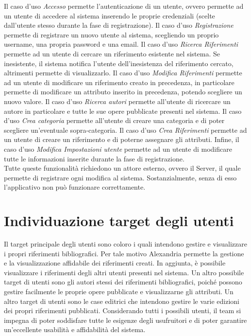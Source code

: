 Il caso d'uso \textit{Accesso} permette l'autenticazione di un utente, ovvero permette ad un utente di accedere al sistema inserendo le proprie credenziali (scelte dall'utente stesso durante la fase di registrazione). Il caso d'uso \textit{Registrazione} permette di registrare un nuovo utente al sistema, scegliendo un proprio username, una propria password e una email. Il caso d'uso \textit{Ricerca Riferimenti} permette ad un utente di cercare un riferimento esistente nel sistema. Se inesistente, il sistema notifica l'utente dell'inesistenza del riferimento cercato, altrimenti permette di visualizzarlo. Il caso d'uso \textit{Modifica Riferimenti} permette ad un utente di modificare un riferimento creato in precedenza, in particolare permette di modificare un \gls{attributo} inserito in precedenza,  potendo scegliere un nuovo valore. Il caso d'uso \textit{Ricerca autori} permette all'utente di ricercare un autore in particolare e tutte le sue opere pubblicate presenti nel sistema. Il caso d'uso \textit{Crea categoria} permette all'utente di creare una categoria e di poter scegliere un'eventuale \gls{sopra-categoria}. Il caso d'uso \textit{Crea Riferimenti} permette ad un utente di creare un riferimento e di poterne assegnare gli attributi. Infine, il caso d'uso \textit{Modifica Impostazioni utente} permette ad un utente di modificare tutte le informazioni inserite durante la fase di registrazione.\\
Tutte queste funzionalità richiedono un attore esterno, ovvero il Server, il quale permette di registrare ogni modifica al sistema. Sostanzialmente, senza di esso l'applicativo non può funzionare correttamente.


\raggedright{\section{Individuazione target degli utenti}}
Il target principale degli utenti sono coloro i quali intendono gestire e visualizzare i propri riferimenti bibliografici. Per tale motivo Alexandria permette la gestione e la visualizzazione affidabile dei riferimenti creati. In aggiunta, è possibile visualizzare i riferimenti degli altri utenti presenti nel sistema.
Un altro possibile target di utenti sono gli autori stessi dei riferimenti bibliografici, poiché possono gestire facilmente le proprie opere pubblicate e visualizzarne gli attributi.
Un altro target di utenti sono le case editrici che intendono gestire le varie edizioni dei propri riferimenti pubblicati. 
Considerando tutti i possibili utenti, il team si impegna di poter soddisfare tutte le esigenze degli usufruitori e di poter garantire un'eccellente usabilità e affidabilità del sistema.

